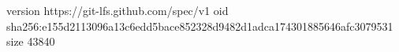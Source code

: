 version https://git-lfs.github.com/spec/v1
oid sha256:e155d2113096a13c6edd5bace852328d9482d1adca174301885646afc3079531
size 43840
